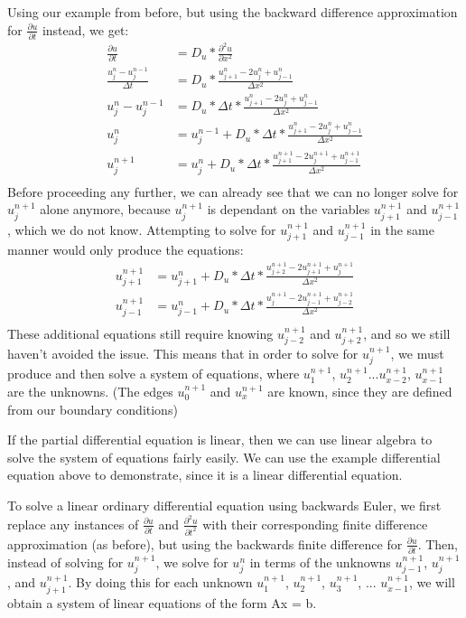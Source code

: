 \documentclass[11pt]{article}
\begin{document}
Using our example from before, but using the backward difference approximation for $\frac{\partial u}{\partial t}$ instead, we get:
\begin{align*}
    \frac{\partial u}{\partial t} &= D_u * \frac{\partial^{2} u}{\partial x^{2}}\\
    \frac{u^{n}_{j}-u^{n-1}_{j}}{\Delta t} &= D_u * \frac{u^{n}_{j+1}-2u^{n}_{j}+u^{n}_{j-1}}{\Delta x^2}\\
    u^{n}_{j} - u^{n-1}_{j}&= D_u *\Delta t*    \frac{u^{n}_{j+1}-2u^{n}_{j}+u^{n}_{j-1}}{\Delta x^2}\\
    u^{n}_{j} &= u^{n-1}_{j} + D_u *\Delta t*    \frac{u^{n}_{j+1}-2u^{n}_{j}+u^{n}_{j-1}}{\Delta x^2}\\
    u^{n+1}_{j} &= u^{n}_{j} + D_u *\Delta t*    \frac{u^{n+1}_{j+1}-2u^{n+1}_{j}+u^{n+1}_{j-1}}{\Delta x^2}\\
\end{align*}
Before proceeding any further, we can already see that we can no longer solve for $u^{n+1}_{j}$ alone anymore, because $u^{n+1}_{j}$ is dependant on the variables $u^{n+1}_{j+1}$ and $u^{n+1}_{j-1}$, which we do not know. Attempting to solve for $u^{n+1}_{j+1}$ and $u^{n+1}_{j-1}$ in the same manner would only produce the equations:
\begin{align*}
    u^{n+1}_{j+1} &= u^{n}_{j+1} + D_u *\Delta t*    \frac{u^{n+1}_{j+2}-2u^{n+1}_{j+1}+u^{n+1}_{j}}{\Delta x^2}\\
    u^{n+1}_{j-1} &= u^{n}_{j-1} + D_u *\Delta t*    \frac{u^{n+1}_{j}-2u^{n+1}_{j-1}+u^{n+1}_{j-2}}{\Delta x^2}\\
\end{align*}
These additional equations still require knowing $u^{n+1}_{j-2}$ and $u^{n+1}_{j+2}$, and so we still haven't avoided the issue. This means that in order to solve for $u^{n+1}_{j}$, we must produce and then solve a system of equations, where $u^{n+1}_{1}$, $u^{n+1}_{2}$...$u^{n+1}_{x-2}$, $u^{n+1}_{x-1}$ are the unknowns. (The edges $u^{n+1}_{0}$ and $u^{n+1}_{x}$ are known, since they are defined from our boundary conditions)

If the partial differential equation is linear, then we can use linear algebra to solve the system of equations fairly easily. We can use the example differential equation above to demonstrate, since it is a linear differential equation. 

To solve a linear ordinary differential equation using backwards Euler, we first replace any instances of $\frac{\partial u}{\partial t}$ and $\frac{\partial^{2} u}{\partial t^{2}}$ with their corresponding finite difference approximation (as before), but using the backwards finite difference for $\frac{\partial u}{\partial t}$. Then, instead of solving for $u^{n+1}_{j}$, we solve for $u^{n}_{j}$ in terms of the unknowns $u^{n+1}_{j-1}$, $u^{n+1}_{j}$, and $u^{n+1}_{j+1}$. By doing this for each unknown $u^{n+1}_{1}$, $u^{n+1}_{2}$, $u^{n+1}_{3}$, ... $u^{n+1}_{x-1}$, we will obtain a system of linear equations of the form Ax = b.
\end{document}
